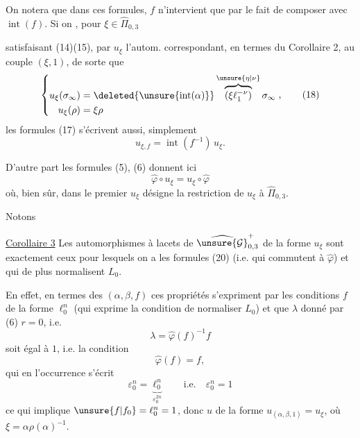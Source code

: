 On notera que dans ces formules, $f$ n'intervient que par le fait de
composer avec $\operatorname{int}(f)$. Si on
, pour $\xi\in\widehat\Pi_{0,3}$


satisfaisant (14)(15), par $u_\xi$ l'autom.
 correspondant, en termes du
Corollaire 2, au couple $(\xi,1)$, de sorte que
\[
\left\{\begin{aligned}
u_\xi(\sigma_\infty)
 &=\deleted{\unsure{\operatorname{int}(\alpha)}}
 \overbrace{(\xi\ell_1^{-\nu})}^{\unsure{\eta|\nu}}\sigma_\infty\\
u_\xi(\rho)&=\xi\rho
\end{aligned}\right.,
\tag{18}
\]
les formules (17) s'écrivent aussi, simplement
\[
u_{\xi,f}=\operatorname{int}(f^{-1})\,u_\xi.
\tag{19}
\]

D'autre part les formules (5), (6) donnent ici
\[
\widehat\varphi\circ u_\xi=u_\xi\circ\widehat\varphi
\tag{20}
\]
où, bien sûr, dans le premier  $u_\xi$ désigne la
restriction de $u_\xi$ à $\widehat\Pi_{0,3}$.

Notons

\uline{Corollaire 3} Les automorphismes à lacets de
$\widehat{\unsure{\mathcal G}}_{0,3}^{+}$ de la forme $u_\xi$
 sont exactement ceux pour
lesquels on a les  formules (20) (i.e. qui
 commutent à $\widehat\varphi$) et qui de plus
normalisent $L_0$.


En effet, en termes des  $(\alpha,\beta,f)$  ces propriétés s'expriment par les conditions   $f$ de la forme $\ell_0^n$ (qui exprime la condition de normaliser $L_0$) et que $\lambda$ donné par (6)  $r=0$, i.e.
\[
\lambda=\widehat\varphi(f)^{-1}f
\tag{21}
\]
soit égal à $1$, i.e. la condition
\[
\widehat\varphi(f)=f,
\tag{22}
\]
qui en l'occurrence s'écrit
\[
\varepsilon_0^n=\underbrace{\ell_0^n}_{\varepsilon_0^{2n}}
\qquad\text{i.e.}\quad \varepsilon_0^n=1
\]
ce qui implique $\unsure{f|f_0}=\ell_0^n=1$, donc $u$ de la forme $u_{(\alpha,\beta,1)}=u_\xi$, où $\xi=\alpha\rho(\alpha)^{-1}$.

